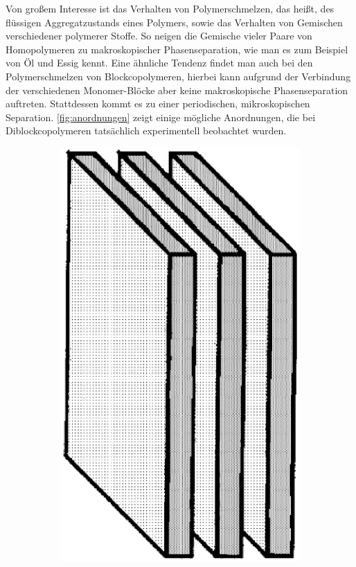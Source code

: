 Von großem Interesse ist das Verhalten von Polymerschmelzen, das heißt, des flüssigen Aggregatzustands eines Polymers, sowie das Verhalten von Gemischen verschiedener polymerer Stoffe.
So neigen die Gemische vieler Paare von Homopolymeren zu makroskopischer Phasenseparation, wie man es zum Beispiel von Öl und Essig kennt.
Eine ähnliche Tendenz findet man auch bei den Polymerschmelzen von Blockcopolymeren, hierbei kann aufgrund der Verbindung der verschiedenen Monomer-Blöcke aber keine makroskopische Phasenseparation auftreten.
Stattdessen kommt es zu einer periodischen, mikroskopischen Separation.
\autoref{fig:anordnungen} zeigt einige mögliche Anordnungen, die bei Diblockcopolymeren tatsächlich experimentell beobachtet wurden.

\begin{figure}[tb]
    \centering
    \begin{subfigure}[b]{0.18\textwidth}
        \includegraphics[width=\textwidth]{figures/einleitung/fig1}

\end{subfigure}
\end{figure}
